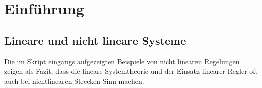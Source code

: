 \section{Einführung}
\subsection{Lineare und nicht lineare Systeme  }
Die im Skript eingangs aufgezeigten Beispiele von nicht linearen Regelungen zeigen als Fazit, dass die lineare Systemtheorie und der Einsatz linearer Regler oft auch bei nichtlinearen Strecken Sinn machen.